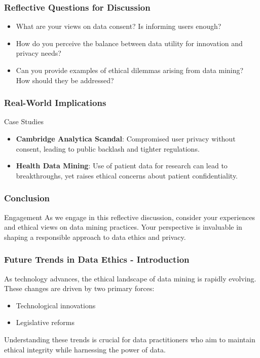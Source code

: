 \documentclass[aspectratio=169]{beamer}
\begin{document}
\begin{frame}[fragile]
    \frametitle{Reflective Questions for Discussion}
    \begin{itemize}
        \item What are your views on data consent? Is informing users enough?
        \item How do you perceive the balance between data utility for innovation and privacy needs?
        \item Can you provide examples of ethical dilemmas arising from data mining? How should they be addressed?
    \end{itemize}
\end{frame}

\begin{frame}[fragile]
    \frametitle{Real-World Implications}
    \begin{block}{Case Studies}
        \begin{itemize}
            \item \textbf{Cambridge Analytica Scandal}: Compromised user privacy without consent, leading to public backlash and tighter regulations.
            \item \textbf{Health Data Mining}: Use of patient data for research can lead to breakthroughs, yet raises ethical concerns about patient confidentiality.
        \end{itemize}
    \end{block}
\end{frame}

\begin{frame}[fragile]
    \frametitle{Conclusion}
    \begin{block}{Engagement}
        As we engage in this reflective discussion, consider your experiences and ethical views on data mining practices. Your perspective is invaluable in shaping a responsible approach to data ethics and privacy.
    \end{block}
\end{frame}

\begin{frame}[fragile]
    \frametitle{Future Trends in Data Ethics - Introduction}
    As technology advances, the ethical landscape of data mining is rapidly evolving. These changes are driven by two primary forces:
    \begin{itemize}
        \item Technological innovations
        \item Legislative reforms
    \end{itemize}
    Understanding these trends is crucial for data practitioners who aim to maintain ethical integrity while harnessing the power of data.
\end{frame}
\end{document}
